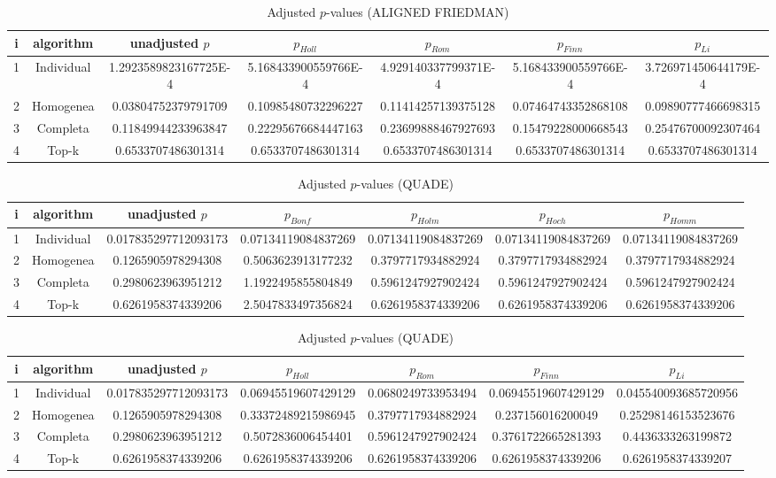 \documentclass[a4paper,10pt]{article}
\begin{document}
\begin{landscape}
\begin{table}[!htp]
\centering\scriptsize
\caption{Adjusted $p$-values (ALIGNED FRIEDMAN)}
\begin{tabular}{ccccccc}
i&algorithm&unadjusted $p$&$p_{Holl}$&$p_{Rom}$&$p_{Finn}$&$p_{Li}$\\
\hline
1&Individual&1.2923589823167725E-4&5.168433900559766E-4&4.929140337799371E-4&5.168433900559766E-4&3.726971450644179E-4\\
2&Homogenea&0.03804752379791709&0.10985480732296227&0.11414257139375128&0.07464743352868108&0.09890777466698315\\
3&Completa&0.11849944233963847&0.22295676684447163&0.23699888467927693&0.15479228000668543&0.25476700092307464\\
4&Top-k&0.6533707486301314&0.6533707486301314&0.6533707486301314&0.6533707486301314&0.6533707486301314\\
\hline
\end{tabular}
\end{table}


\newpage

\begin{table}[!htp]
\centering\scriptsize
\caption{Adjusted $p$-values (QUADE)}
\begin{tabular}{ccccccc}
i&algorithm&unadjusted $p$&$p_{Bonf}$&$p_{Holm}$&$p_{Hoch}$&$p_{Homm}$\\
\hline
1&Individual&0.017835297712093173&0.07134119084837269&0.07134119084837269&0.07134119084837269&0.07134119084837269\\
2&Homogenea&0.1265905978294308&0.5063623913177232&0.3797717934882924&0.3797717934882924&0.3797717934882924\\
3&Completa&0.2980623963951212&1.1922495855804849&0.5961247927902424&0.5961247927902424&0.5961247927902424\\
4&Top-k&0.6261958374339206&2.5047833497356824&0.6261958374339206&0.6261958374339206&0.6261958374339206\\
\hline
\end{tabular}
\end{table}

\begin{table}[!htp]
\centering\scriptsize
\caption{Adjusted $p$-values (QUADE)}
\begin{tabular}{ccccccc}
i&algorithm&unadjusted $p$&$p_{Holl}$&$p_{Rom}$&$p_{Finn}$&$p_{Li}$\\
\hline
1&Individual&0.017835297712093173&0.06945519607429129&0.0680249733953494&0.06945519607429129&0.045540093685720956\\
2&Homogenea&0.1265905978294308&0.33372489215986945&0.3797717934882924&0.237156016200049&0.25298146153523676\\
3&Completa&0.2980623963951212&0.5072836006454401&0.5961247927902424&0.3761722665281393&0.4436333263199872\\
4&Top-k&0.6261958374339206&0.6261958374339206&0.6261958374339206&0.6261958374339206&0.6261958374339207\\
\hline
\end{tabular}
\end{table}

\end{landscape}
\end{document}
